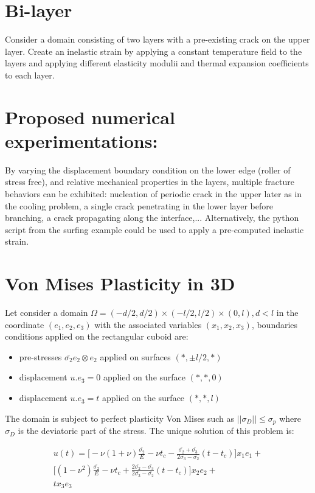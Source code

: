 \documentclass[10pt,oneside]{memoir}
\begin{document}
\section{Bi-layer}
Consider a domain consisting of two layers with a pre-existing crack on the upper layer. Create an inelastic strain by applying a constant temperature field to the layers and applying different elasticity modulii and thermal expansion coefficients to each layer.

\section*{Proposed numerical experimentations:}
By varying the displacement boundary condition on the lower edge (roller of stress free), and relative mechanical properties in the layers, multiple fracture behaviors can be exhibited: nucleation of periodic crack in the upper later as in the cooling problem, a single crack penetrating in the lower layer before branching, a crack propagating along the interface,...
Alternatively, the python script from the surfing example could be used to apply a pre-computed inelastic strain.

\section{Von Mises Plasticity in 3D}
Let consider a domain $\Omega= (-d/2,d/2) \times (-l/2,l/2) \times (0,l), d<l$ in the coordinate $(e_1, e_2, e_3)$ with the associated variables $(x_1, x_2, x_3)$, boundaries conditions applied on the rectangular cuboid are:
\begin{itemize}
\item pre-stresses $\bar{\sigma_2} e_2 \otimes e_2$ applied on surfaces $(*, \pm l/2,*)$
\item displacement $u.e_3 = 0$ applied on the surface $(*,*,0)$
\item displacement $u.e_3 = t$ applied on the surface $(*,*,l)$
\end{itemize}

The domain is subject to perfect plasticity Von Mises such as $||\sigma_D|| \leq \sigma_p$ where $\sigma_D$ is the deviatoric part of the stress. The unique solution of this problem is:

\begin{equation}
\begin{split}
\label{eq:UsolVonMises3D}
u(t)= \Big[ -\nu(1+\nu)\frac{\bar{\sigma_2}}{E} -\nu t_c - \frac{\bar{\sigma_2}+\bar{\sigma_3}}{2\bar{\sigma_3}-\bar{\sigma_2}} (t-t_c)\Big]x_1 e_1+\\
	\Big[ (1-\nu^2)\frac{\bar{\sigma_2}}{E} - \nu t_c + \frac{2\bar{\sigma_2}-\bar{\sigma_3}}{2\bar{\sigma_3}-\bar{\sigma_2}}(t-t_c) \Big] x_2 e_2 + \\
	t x_3 e_3
\end{split}
\end{equation}
\end{document}
